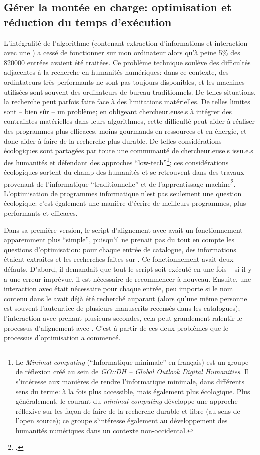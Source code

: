 \subsection{Gérer la montée en charge: optimisation et réduction du temps d'exécution}
L'intégralité de l'algorithme (contenant extraction d'informations et interaction avec une \api{}) a cessé de fonctionner sur mon ordinateur alors qu'à peine 5\% des 820000 entrées avaient été traitées. Ce problème technique soulève des difficultés adjacentes à la recherche en humanités numériques: dans ce contexte, des ordintateurs très performants ne sont pas toujours disponibles, et les machines utilisées sont souvent des ordinateurs de bureau traditionnels. De telles situations, la recherche peut parfois faire face à des limitations matérielles. De telles limites sont -- bien sûr -- un problème; en obligeant chercheur.euse.s à intégrer des contraintes matérielles dans leurs algorithmes, cette difficulté peut aider à réaliser des programmes plus efficaces, moins gourmands en ressources et en énergie, et donc aider à faire de la recherche plus durable. De telles considérations écologiques sont partagées par toute une communauté de chercheur.euse.s issu.e.s des humanités et défendant des approches \enquote{low-tech}\footnote{
	Le \textit{Minimal computing} (\enquote{Informatique minimale} en français) est un groupe de réflexion créé au sein de \textit{GO::DH -- Global Outlook Digital Humanities}. Il s'intéresse aux manières de rendre l'informatique minimale, dans différents sens du terme: à la fois plus accessible, mais également plus écologique. Plus généralement, le courant du \textit{minimal computing} développe une approche réflexive sur les façon de faire de la recherche durable et libre (au sens de l'\gls{open source}); ce groupe s'intéresse également au développement des humanités numériques dans un contexte non-occidental\cite{sayers_minimal_2016}.
}; ces considérations écologiques sortent du champ des humanités et se retrouvent dans des travaux provenant de l'informatique \enquote{traditionnelle} et de l'apprentissage machine\footcite{strubell_energy_2019}. L'optimisation de programmes informatique n'est pas seulement une question écologique: c'est également une manière d'écrire de meilleurs programmes, plus performants et efficaces.

Dans sa première version, le script d'alignement avec \wkd{} avait un fonctionnement apparemment plus \enquote{simple}, puisqu'il ne prenait pas du tout en compte les questions d'optimisation: pour chaque entrée de catalogue, des informations étaient extraites et les recherches faites sur \wkd{}. Ce fonctionnement avait deux défauts. D'abord, il demandait que tout le script soit exécuté en une fois -- si il y a une erreur imprévue, il est nécessaire de recommencer à nouveau. Ensuite, une interaction avec \wkd{} était nécessaire pour chaque entrée, peu importe si le nom contenu dans le \tname{} avait déjà été recherché auparant (alors qu'une même personne est souvent l'auteur.ice de plusieurs manuscrits recensés dans les catalogues); l'interaction avec \wkd{} prenant plusieurs secondes, cela peut grandement ralentir le processus d'alignement avec \wkd{}. C'est à partir de ces deux problèmes que le processus d'optimisation a commencé.

